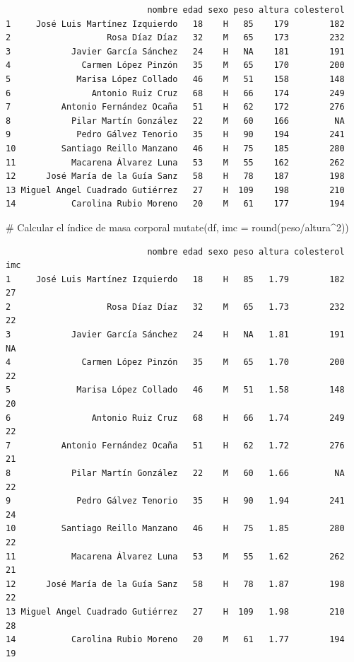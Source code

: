 \documentclass[
  a4paper,
]{scrreport}
\newenvironment{Shaded}{\begin{snugshade}}{\end{snugshade}}
\newcommand{\AttributeTok}[1]{\textcolor[rgb]{0.40,0.45,0.13}{#1}}
\newcommand{\CommentTok}[1]{\textcolor[rgb]{0.37,0.37,0.37}{#1}}
\newcommand{\DecValTok}[1]{\textcolor[rgb]{0.68,0.00,0.00}{#1}}
\newcommand{\FunctionTok}[1]{\textcolor[rgb]{0.28,0.35,0.67}{#1}}
\newcommand{\NormalTok}[1]{\textcolor[rgb]{0.00,0.23,0.31}{#1}}
\newcommand{\SpecialCharTok}[1]{\textcolor[rgb]{0.37,0.37,0.37}{#1}}
\theoremstyle{definition}
\theoremstyle{definition}
\theoremstyle{remark}
\begin{document}
\begin{verbatim}
                            nombre edad sexo peso altura colesterol
1     José Luis Martínez Izquierdo   18    H   85    179        182
2                   Rosa Díaz Díaz   32    M   65    173        232
3            Javier García Sánchez   24    H   NA    181        191
4              Carmen López Pinzón   35    M   65    170        200
5             Marisa López Collado   46    M   51    158        148
6                Antonio Ruiz Cruz   68    H   66    174        249
7          Antonio Fernández Ocaña   51    H   62    172        276
8            Pilar Martín González   22    M   60    166         NA
9             Pedro Gálvez Tenorio   35    H   90    194        241
10         Santiago Reillo Manzano   46    H   75    185        280
11           Macarena Álvarez Luna   53    M   55    162        262
12      José María de la Guía Sanz   58    H   78    187        198
13 Miguel Angel Cuadrado Gutiérrez   27    H  109    198        210
14           Carolina Rubio Moreno   20    M   61    177        194
\end{verbatim}

\begin{Shaded}
\begin{Highlighting}[]
\CommentTok{\# Calcular el índice de masa corporal}
\FunctionTok{mutate}\NormalTok{(df, }\AttributeTok{imc =} \FunctionTok{round}\NormalTok{(peso}\SpecialCharTok{/}\NormalTok{altura}\SpecialCharTok{\^{}}\DecValTok{2}\NormalTok{))}
\end{Highlighting}
\end{Shaded}

\begin{verbatim}
                            nombre edad sexo peso altura colesterol imc
1     José Luis Martínez Izquierdo   18    H   85   1.79        182  27
2                   Rosa Díaz Díaz   32    M   65   1.73        232  22
3            Javier García Sánchez   24    H   NA   1.81        191  NA
4              Carmen López Pinzón   35    M   65   1.70        200  22
5             Marisa López Collado   46    M   51   1.58        148  20
6                Antonio Ruiz Cruz   68    H   66   1.74        249  22
7          Antonio Fernández Ocaña   51    H   62   1.72        276  21
8            Pilar Martín González   22    M   60   1.66         NA  22
9             Pedro Gálvez Tenorio   35    H   90   1.94        241  24
10         Santiago Reillo Manzano   46    H   75   1.85        280  22
11           Macarena Álvarez Luna   53    M   55   1.62        262  21
12      José María de la Guía Sanz   58    H   78   1.87        198  22
13 Miguel Angel Cuadrado Gutiérrez   27    H  109   1.98        210  28
14           Carolina Rubio Moreno   20    M   61   1.77        194  19
\end{verbatim}
\end{document}
